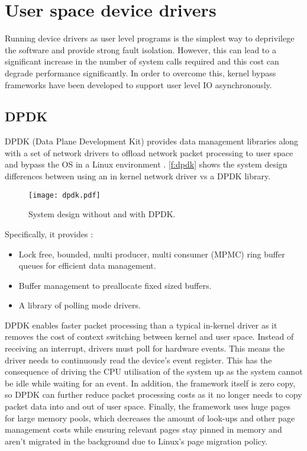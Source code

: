 \section{User space device drivers}\label{s:userspace_dd}
Running device drivers as user level programs is the simplest way to deprivilege the software and provide
strong fault isolation. However, this can lead to a significant increase in the number of system calls
required and this cost can degrade performance significantly. In order to overcome this, kernel bypass
frameworks have been developed to support user level IO asynchronously.

\subsection{DPDK}\label{dpdk}
DPDK (Data Plane Development Kit) provides data management libraries along with a set of network drivers to offload
network packet processing to user space and bypass the OS in a Linux environment \cite{DPDK:wp_20}. \autoref{f:dpdk}
shows the system design differences between using an in kernel network driver vs a DPDK library.

\begin{figure}[h]
  \centering
  \texttt{[image: dpdk.pdf]}
  \caption{System design without and with DPDK.}
  \label{f:dpdk}
\end{figure}

Specifically, it provides \cite{DPDK:wp_20}:
\begin{itemize}
	\item Lock free, bounded, multi producer, multi consumer (MPMC) ring buffer queues for efficient data management.
	\item Buffer management to preallocate fixed sized buffers.
	\item A library of polling mode drivers.
\end{itemize}

DPDK enables faster packet processing than a typical in-kernel driver as it removes the cost of context switching
between kernel and user space. Instead of receiving an interrupt, drivers must poll for hardware events. 
This means the driver needs to continuously read the device's event register. This has the consequence of driving
the CPU utilisation of the system up as the system cannot be idle while waiting for an event. 
In addition, the framework itself is zero copy, so DPDK can further reduce packet processing costs as it no longer needs to copy 
packet data into and out of user space. Finally, the framework uses huge pages for large memory pools, 
which decreases the amount of look-ups and other page management costs while ensuring relevant pages stay pinned in memory and
aren't migrated in the background due to Linux's page migration policy.

